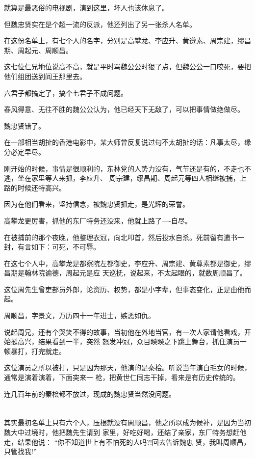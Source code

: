 \documentclass[11pt,a4paper,onecolumn]{article}
\begin{document}
就算是最恶俗的电视剧，演到这里，坏人也该休息了。

但魏忠贤实在是个超一流的反派，他还列出了另一张杀人名单。

在这份名单上，有七个人的名字，分别是高攀龙、李应升、黄遵素、周宗建，缪昌期、周起元、周顺昌。

这七位仁兄地位说高不高，就是平时骂魏公公时狠了点，但魏公公一口咬死，要把他们组团送到阎王那里去。

六君子都搞定了，搞个七君子不成问题。

春风得意、无往不胜的魏公公认为，他已经天下无敌了，可以把事情做绝做尽。

魏忠贤错了。

在一部相当胡扯的香港电影中，某大师曾反复说过句不太胡扯的话：凡事太尽，缘分必定早尽。

刚开始的时候，事情是很顺利的，东林党的人势力没有，气节还是有的，不走也不逃，坐在家里等人来抓，李应升、
周宗建，缪昌期、周起元等四人相继被捕，上路的时候还特高兴。

因为在他们看来，坚持信念，被魏忠贤抓走，是光辉的荣誉。

高攀龙更厉害，抓他的东厂特务还没来，他就上路了----自尽。

在被捕前的那个夜晚，他整理衣冠，向北叩首，然后投水自杀。死前留有遗书一封，有言如下：可死，不可辱。

在这七个人中，高攀龙是都察院左都御史，李应升、周宗建、黄尊素都是御史，缪昌期是翰林院谕德，周起元是应
天巡抚，说起来，不太起眼的，就数周顺昌了。

这位周先生曾吏部员外郎，论资历、权势，都是小字辈，但事态变化，正是由他而起。

周顺昌，字景文，万历四十一年进士，嫉恶如仇。

说起周兄，还有个哭笑不得的故事，当初他在外地当官，有一次人家请他看戏，开始挺高兴，结果看到一半，突然
怒发冲冠，众目睽睽之下跳上舞台，抓住演员一顿暴打，打完就走。

这位演员之所以被打，只是因为那天，他演的是秦桧。听说当年演白毛女的时候，通常是演着演着，下面突来一
枪，把黄世仁同志干掉，看来是有历史传统的。

连几百年前的秦桧都不放过，现成的魏忠贤当然没问题。

\section[\thesection]{}

其实最初名单上只有六个人，压根就没有周顺昌，他之所以成为候补，是因为当初魏大中过境时，他把魏先生请到
家里，好吃好喝，还结了亲家，东厂特务想赶他走，结果他说： ``你不知道世上有不怕死的人吗?!回去告诉魏忠
贤，我叫周顺昌，只管找我!''
\end{document}

